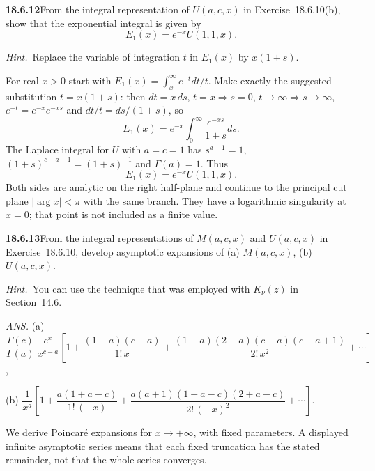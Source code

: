 \par\bigskip
\noindent\textbf{18.6.12}\quad From the integral representation of
$U(a,c,x)$ in Exercise~18.6.10(b), show that the exponential
integral is given by
\[
E_{1}(x)=e^{-x}U(1,1,x).
\]
\par\emph{Hint.}~Replace the variable of integration $t$ in
$E_{1}(x)$ by $x(1+s)$.
\par\nobreak
\solution
For real $x>0$ start with
$E_1(x)=\int_x^\infty e^{-t}dt/t$.
Make exactly the suggested substitution $t=x(1+s)$: then
$dt=x\,ds$, $t=x\Rightarrow s=0$, $t\to\infty\Rightarrow s\to\infty$,
$e^{-t}=e^{-x}e^{-xs}$ and $dt/t=ds/(1+s)$, so
\[
E_1(x)=e^{-x}\int_0^\infty\frac{e^{-xs}}{1+s}ds.
\]
The Laplace integral for $U$ with $a=c=1$ has
$s^{a-1}=1$, $(1+s)^{c-a-1}=(1+s)^{-1}$ and $\Gamma(a)=1$.
Thus
\[
\boxed{E_1(x)=e^{-x}U(1,1,x)}.
\]
Both sides are analytic on the right half-plane and continue to
the principal cut plane $|\arg x|<\pi$ with the same branch.
They have a logarithmic singularity at $x=0$; that point is not
included as a finite value.

\par\bigskip
\noindent\textbf{18.6.13}\quad From the integral representations of
$M(a,c,x)$ and $U(a,c,x)$ in Exercise~18.6.10, develop asymptotic
expansions of (a) $M(a,c,x)$, (b) $U(a,c,x)$.
\par\emph{Hint.}~You can use the technique that was employed with
$K_{\nu}(z)$ in Section~14.6.
\par\nobreak\hfill\emph{ANS.}\enspace
(a) $\dfrac{\Gamma(c)}{\Gamma(a)}\,\dfrac{e^{x}}{x^{c-a}}
\left[1+\dfrac{(1-a)(c-a)}{1!\,x}
+\dfrac{(1-a)(2-a)(c-a)(c-a+1)}{2!\,x^{2}}+\cdots\right]$,\par\nobreak
\hfill(b) $\dfrac{1}{x^{a}}\left[1+\dfrac{a(1+a-c)}{1!\,(-x)}
+\dfrac{a(a+1)(1+a-c)(2+a-c)}{2!\,(-x)^{2}}+\cdots\right]$.\par\nobreak
{}\par\nobreak
\solution
We derive Poincar\'e expansions for $x\to+\infty$, with fixed
parameters.  A displayed infinite asymptotic series means that
each fixed truncation has the stated remainder, not that the
whole series converges.

